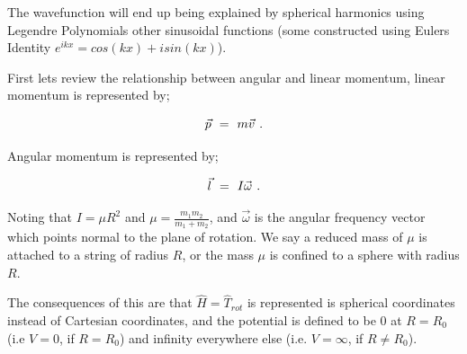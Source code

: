 \documentclass{article}
\begin{document}
The wavefunction will end up being explained by spherical harmonics using Legendre Polynomials other sinusoidal functions (some constructed using Eulers Identity \begin{math} e^{i k x} = cos(kx) + i sin(kx) \end{math}). 

First lets review the relationship between angular and linear momentum, linear momentum is represented by;

\begin{equation} \label{eb-eq-256-31}
\vec{p} \hspace{0.125cm} = \hspace{0.125cm} m \vec{v} \hspace{0.125cm} .
\end{equation}

Angular momentum is represented by;

\begin{equation} \label{eb-eq-256-32}
\vec{l} \hspace{0.125cm} = \hspace{0.125cm} I \vec{\omega} \hspace{0.125cm} .
\end{equation}

Noting that \begin{math} I = \mu R^2 \end{math} and \begin{math} \mu = \frac{m_1 m_2}{m_1 + m_2} \end{math}, and \begin{math} \vec{\omega}  \end{math} is the angular frequency vector which points normal to the plane of rotation. We say a reduced mass of \begin{math} \mu \end{math} is attached to a string of radius \begin{math} R \end{math}, or the mass \begin{math} \mu \end{math} is 
confined to a sphere with radius \begin{math} R \end{math}. 

The consequences of this are that \begin{math} \hat{H} = \hat{T}_{rot}  \end{math} is represented is spherical coordinates instead of Cartesian coordinates, and the potential is defined to be 0 at \begin{math} R = R_0  \end{math} (i.e \begin{math} V = 0 \end{math}, if \begin{math} R = R_0  \end{math}) and infinity everywhere else (i.e. \begin{math} V = \infty \end{math}, if \begin{math} R \neq R_0  \end{math}). 
\end{document}
